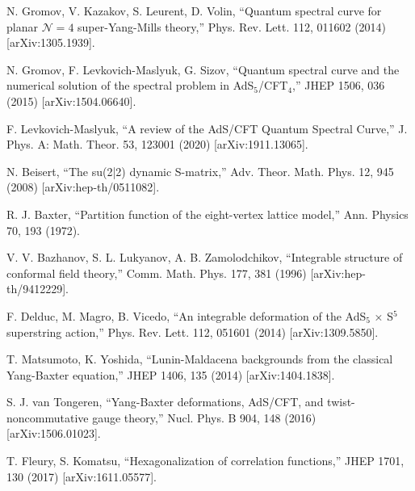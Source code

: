 \documentclass[11pt]{article}
\begin{document}
\begin{thebibliography}{20}

N. Gromov, V. Kazakov, S. Leurent, D. Volin, 
``Quantum spectral curve for planar $\mathcal{N} = 4$ super-Yang-Mills theory,''
Phys. Rev. Lett. 112, 011602 (2014) [arXiv:1305.1939].

N. Gromov, F. Levkovich-Maslyuk, G. Sizov,
``Quantum spectral curve and the numerical solution of the spectral problem in AdS$_5$/CFT$_4$,''
JHEP 1506, 036 (2015) [arXiv:1504.06640].

F. Levkovich-Maslyuk,
``A review of the AdS/CFT Quantum Spectral Curve,''
J. Phys. A: Math. Theor. 53, 123001 (2020) [arXiv:1911.13065].

N. Beisert,
``The su(2|2) dynamic S-matrix,''
Adv. Theor. Math. Phys. 12, 945 (2008) [arXiv:hep-th/0511082].

R. J. Baxter,
``Partition function of the eight-vertex lattice model,''
Ann. Physics 70, 193 (1972).

V. V. Bazhanov, S. L. Lukyanov, A. B. Zamolodchikov,
``Integrable structure of conformal field theory,''
Comm. Math. Phys. 177, 381 (1996) [arXiv:hep-th/9412229].

F. Delduc, M. Magro, B. Vicedo,
``An integrable deformation of the AdS$_5$ × S$^5$ superstring action,''
Phys. Rev. Lett. 112, 051601 (2014) [arXiv:1309.5850].

T. Matsumoto, K. Yoshida,
``Lunin-Maldacena backgrounds from the classical Yang-Baxter equation,''
JHEP 1406, 135 (2014) [arXiv:1404.1838].

S. J. van Tongeren,
``Yang-Baxter deformations, AdS/CFT, and twist-noncommutative gauge theory,''
Nucl. Phys. B 904, 148 (2016) [arXiv:1506.01023].

T. Fleury, S. Komatsu,
``Hexagonalization of correlation functions,''
JHEP 1701, 130 (2017) [arXiv:1611.05577].

\end{thebibliography}
\end{document}
